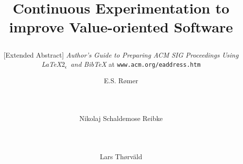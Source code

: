 \documentclass{sig-alternate}
\begin{document}
\title{Continuous Experimentation to improve Value-oriented Software
\subtitle{[Extended Abstract]
\textit{Author's Guide to Preparing ACM SIG Proceedings Using
\LaTeX$2_\epsilon$\ and BibTeX} at
\texttt{www.acm.org/eaddress.htm}}}
%
%
%
%
%

%
\author{
%
%
\alignauthor
E.S. R{\o}mer\\
       \\
       \\
       \\
\alignauthor
Nikolaj Schaldemose Reibke\\
       \\
       \\
       \\
\alignauthor Lars Th{\o}rv{\"a}ld\\\
       \\
       \\
       \\
}
\end{document}
